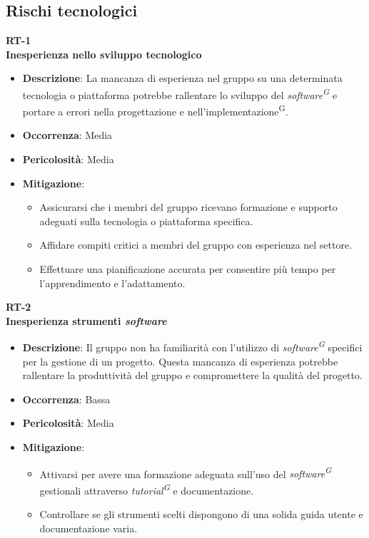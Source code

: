 \documentclass[5pt]{article}
\begin{document}
  \subsection{Rischi tecnologici}
    \textbf{RT-1} \\
    \textbf{Inesperienza nello sviluppo tecnologico}
    \begin{itemize}
      \item \textbf{Descrizione}: La mancanza di esperienza nel gruppo su una determinata tecnologia o piattaforma potrebbe rallentare lo sviluppo del \textit{software\textsuperscript{G}} e portare a errori nella progettazione e nell'implementazione\textsuperscript{G}.
      \item \textbf{Occorrenza}: Media
      \item \textbf{Pericolosità}: Media
      \item \textbf{Mitigazione}: 
        \begin{itemize}
          \item Assicurarsi che i membri del gruppo ricevano formazione e supporto adeguati sulla tecnologia o piattaforma specifica.
          \item Affidare compiti critici a membri del gruppo con esperienza nel settore.
          \item Effettuare una pianificazione accurata per consentire più tempo per l'apprendimento e l'adattamento.
          \end{itemize}
    \end{itemize}
    \textbf{RT-2} \\
    \textbf{Inesperienza strumenti \textit{software}}
    \begin{itemize}
      \item \textbf{Descrizione}: Il gruppo non ha familiarità con l'utilizzo di \textit{software\textsuperscript{G}} specifici per la gestione di un progetto. Questa mancanza di esperienza potrebbe rallentare la produttività del gruppo e compromettere la qualità del progetto.
      \item \textbf{Occorrenza}: Bassa
      \item \textbf{Pericolosità}: Media
      \item \textbf{Mitigazione}: 
        \begin{itemize}
          \item  Attivarsi per avere una formazione adeguata sull'uso del \textit{software\textsuperscript{G}} gestionali attraverso \textit{tutorial\textsuperscript{G}} e documentazione.
          \item Controllare se gli strumenti scelti dispongono di una solida guida utente e documentazione varia.
        \end{itemize}
    \end{itemize}
\end{document}
